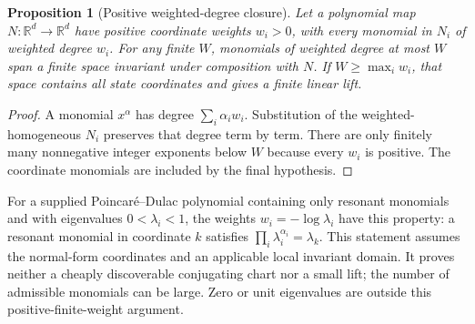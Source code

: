 \documentclass[journal]{IEEEtran}
\newtheorem{proposition}[theorem]{Proposition}
\theoremstyle{definition}
\newcommand{\R}{\mathbb{R}}
\begin{document}
\begin{proposition}[Positive weighted-degree closure]\label{prop:weighted}
Let a polynomial map $N:\R^d\to\R^d$ have positive coordinate weights
$w_i>0$, with every monomial in $N_i$ of weighted degree $w_i$.
For any finite $W$, monomials of weighted degree at most $W$ span a finite
space invariant under composition with $N$. If $W\geq\max_iw_i$, that
space contains all state coordinates and gives a finite linear lift.
\end{proposition}
\begin{proof}
A monomial $x^\alpha$ has degree $\sum_i\alpha_iw_i$. Substitution of the
weighted-homogeneous $N_i$ preserves that degree term by term. There are
only finitely many nonnegative integer exponents below $W$ because every
$w_i$ is positive. The coordinate monomials are included by the final
hypothesis.
\end{proof}
For a supplied Poincar\'e--Dulac polynomial containing only resonant
monomials and with eigenvalues $0<\lambda_i<1$,
the weights $w_i=-\log\lambda_i$ have this property: a resonant monomial
in coordinate $k$ satisfies $\prod_i\lambda_i^{\alpha_i}=\lambda_k$.
This statement assumes the normal-form coordinates and an applicable local
invariant domain. It proves neither a cheaply discoverable conjugating chart
nor a small lift; the number of admissible monomials can be large. Zero
or unit eigenvalues are outside this positive-finite-weight argument.
\end{document}
